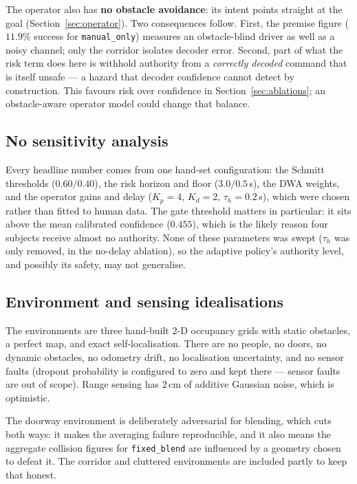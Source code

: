 \documentclass[11pt,a4paper]{article}
\newcommand{\vmanual}{\texttt{manual\_only}}
\newcommand{\vfixed}{\texttt{fixed\_blend}}
\theoremstyle{plain}
\theoremstyle{definition}
\begin{document}
The operator also has \textbf{no obstacle avoidance}: its intent points
straight at the goal (Section~\ref{sec:operator}). Two consequences
follow. First, the premise figure ($11.9\%$ success for \vmanual{})
measures an obstacle-blind driver as well as a noisy channel; only the
corridor isolates decoder error. Second, part of what the risk term does
here is withhold authority from a \emph{correctly decoded} command that
is itself unsafe --- a hazard that decoder confidence cannot detect by
construction. This favours risk over confidence in
Section~\ref{sec:ablations}; an obstacle-aware operator model could
change that balance.

\subsection{No sensitivity analysis}

Every headline number comes from one hand-set configuration: the Schmitt
thresholds ($0.60/0.40$), the risk horizon and floor ($3.0/0.5$\,s), the
DWA weights, and the operator gains and delay ($K_p = 4$, $K_d = 2$,
$\tau_h = 0.2$\,s), which were chosen rather than fitted to human data.
The gate threshold matters in particular: it sits above the mean
calibrated confidence ($0.455$), which is the likely reason four
subjects receive almost no authority. None of these parameters was swept ($\tau_h$ was only removed, in the
no-delay ablation), so the
adaptive policy's authority level, and possibly its safety, may not
generalise.

\subsection{Environment and sensing idealisations}

The environments are three hand-built 2-D occupancy grids with static
obstacles, a perfect map, and exact self-localisation. There are no
people, no doors, no dynamic obstacles, no odometry drift, no
localisation uncertainty, and no sensor faults (dropout probability is
configured to zero and kept there --- sensor faults are out of scope).
Range sensing has $2$\,cm of additive Gaussian noise, which is
optimistic.

The doorway environment is deliberately adversarial for blending, which
cuts both ways: it makes the averaging failure reproducible, and it also
means the aggregate collision figures for \vfixed{} are influenced by a
geometry chosen to defeat it. The corridor and cluttered environments
are included partly to keep that honest.
\end{document}
